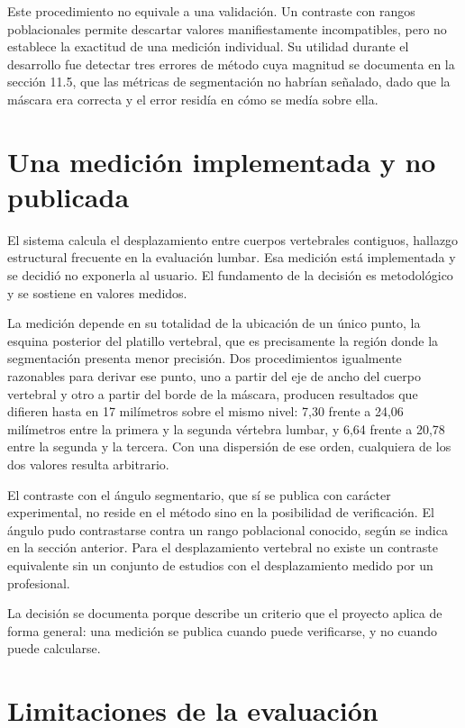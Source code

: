 Este procedimiento no equivale a una validación. Un contraste con rangos poblacionales permite descartar valores manifiestamente incompatibles, pero no establece la exactitud de una medición individual. Su utilidad durante el desarrollo fue detectar tres errores de método cuya magnitud se documenta en la sección 11.5, que las métricas de segmentación no habrían señalado, dado que la máscara era correcta y el error residía en cómo se medía sobre ella.

\section{Una medición implementada y no publicada}

El sistema calcula el desplazamiento entre cuerpos vertebrales contiguos, hallazgo estructural frecuente en la evaluación lumbar. Esa medición está implementada y se decidió no exponerla al usuario. El fundamento de la decisión es metodológico y se sostiene en valores medidos.

La medición depende en su totalidad de la ubicación de un único punto, la esquina posterior del platillo vertebral, que es precisamente la región donde la segmentación presenta menor precisión. Dos procedimientos igualmente razonables para derivar ese punto, uno a partir del eje de ancho del cuerpo vertebral y otro a partir del borde de la máscara, producen resultados que difieren hasta en 17 milímetros sobre el mismo nivel: 7,30 frente a 24,06 milímetros entre la primera y la segunda vértebra lumbar, y 6,64 frente a 20,78 entre la segunda y la tercera. Con una dispersión de ese orden, cualquiera de los dos valores resulta arbitrario.

El contraste con el ángulo segmentario, que sí se publica con carácter experimental, no reside en el método sino en la posibilidad de verificación. El ángulo pudo contrastarse contra un rango poblacional conocido, según se indica en la sección anterior. Para el desplazamiento vertebral no existe un contraste equivalente sin un conjunto de estudios con el desplazamiento medido por un profesional.

La decisión se documenta porque describe un criterio que el proyecto aplica de forma general: una medición se publica cuando puede verificarse, y no cuando puede calcularse.

\section{Limitaciones de la evaluación}

